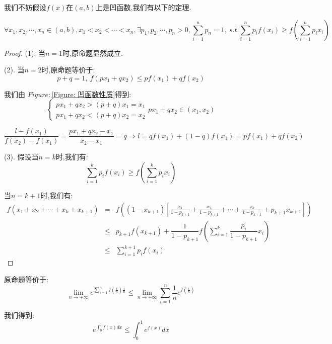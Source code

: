 \begin{solution}
	\begin{anymark}[凹函数性质]
		我们不妨假设$f(x)$在$(a,b)$上是凹函数,我们有以下的定理.
		
		$$\forall x_{1},x_{2},\cdots,x_{n}\in(a,b), x_{1}<x_{2}<\cdots<x_{n}, \exists p_{1},p_{2},\cdots,p_{n}>0,\sum\limits_{i=1}^{n}p_{n}=1,\ s.t. \sum\limits_{i=1}^{n}p_{i}f(x_{i})\geq f(\sum\limits_{i=1}^{n}p_{i}x_{i})$$
		\begin{proof}
			
			(1). 当$n=1$时,原命题显然成立.
			
			(2). 当$n=2$时,原命题等价于: 
			$$p+q=1,\ f(px_{1}+qx_{2})\leq pf(x_{1})+qf(x_{2})$$
			
			我们由 $Figure: $\ref{Figure: 凹函数性质}得到: 
			$$\left\lbrace
			\begin{array}{l}
				px_{1}+qx_{2}>(p+q)x_{1}=x_{1}\\
				px_{1}+qx_{2}<(p+q)x_{2}=x_{2}
			\end{array}
			\right. px_{1}+qx_{2}\in(x_{1},x_{2})$$
			
			$$\dfrac{l-f(x_{1})}{f(x_{2})-f(x_{1})}=\dfrac{px_{1}+qx_{2}-x_{1}}{x_{2}-x_{1}}=q\Rightarrow l=qf(x_{1})+(1-q)f(x_{1})=pf(x_{1})+qf(x_{2})$$
			
			(3). 假设当$n=k$时,我们有: $$\sum\limits_{i=1}^{k}p_{i}f(x_{i})\geq f(\sum\limits_{i=1}^{k}p_{i}x_{i})$$
			
			当$n=k+1$时,我们有: 
			\begin{eqnarray*}
				f(x_{1}+x_{2}+\cdots+x_{k}+x_{k+1})&=&f((1-x_{k+1})[\frac{x_{1}}{1-p_{k+1}}+\frac{x_{2}}{1-p_{k+1}}+\cdots+\frac{x_{k}}{1-p_{k+1}}+p_{k+1}x_{k+1}])\\
				&\leq& p_{k+1}f(x_{k+1})+\dfrac{1}{1-p_{k+1}}f(\sum\limits_{i=1}^{k}\dfrac{p_{i}}{1-p_{k+1}}x_{i})\\
				&\leq & \sum\limits_{i=1}^{k+1}p_{i}f(x_{i})
			\end{eqnarray*}
		\end{proof}
	\end{anymark}
	原命题等价于: 
	$$\lim\limits_{n\rightarrow+\infty}e^{\sum\limits_{i=1}^{n}f(\frac{i}{n})\frac{i}{n}}\leq \lim\limits_{n\rightarrow+\infty}\sum\limits_{i=1}^{n}\frac{1}{n}e^{f(\frac{i}{n})}$$
	
	我们得到: 
	$$e^{\int_{0}^{1}f(x)dx}\leq \int_{0}^{1}e^{f(x)}dx$$
\end{solution}


